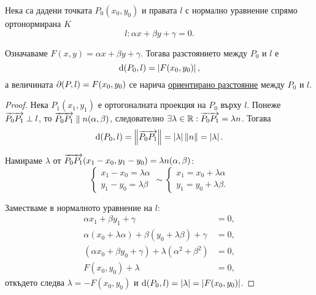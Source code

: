 \documentclass[numbers=endperiod, DIV=15]{scrartcl}
\begin{document}
\begin{theorem}
  Нека са дадени точката $P_0(x_0, y_0)$ и правата $l$ с нормално уравнение спрямо ортонормирана $K$
  \begin{displaymath}
    l: \alpha x + \beta y + \gamma = 0.
  \end{displaymath}

  Означаваме $F(x, y) = \alpha x + \beta y + \gamma$. Тогава разстоянието между $P_0$ и $l$ е
  \begin{displaymath}
    \operatorname{d}(P_0, l) = \left\vert F(x_0, y_0) \right\vert,
  \end{displaymath}
  а величината $\partial(P, l) = F(x_0, y_0)$ се нарича \underline{ориентирано разстояние} между $P_0$ и $l$.
\end{theorem}
\begin{proof}
  Нека $P_1(x_1, y_1)$ е ортогоналната проекция на $P_0$ върху $l$. Понеже $\overrightarrow{P_0 P_1} \perp l$, то $\overrightarrow{P_0 P_1} \parallel n(\alpha, \beta)$, следователно $\exists \lambda \in \mathbb{R}: \overrightarrow{P_0 P_1} = \lambda n$. Тогава
  \begin{displaymath}
    \operatorname{d}(P_0, l)
    =
    \left\Vert \overrightarrow{P_0 P_1} \right\Vert
    =
    \left\vert \lambda \right\vert \left\Vert n \right\Vert
    =
    \left\vert \lambda \right\vert.
  \end{displaymath}

  Намираме $\lambda$ от $\overrightarrow{P_0 P_1}(x_1 - x_0, y_1 - y_0) = \lambda n(\alpha, \beta)$:
  \begin{displaymath}
    \begin{cases}
      x_1 - x_0 = \lambda \alpha \\
      y_1 - y_0 = \lambda \beta
    \end{cases}
    \sim
    \begin{cases}
      x_1 = x_0 + \lambda \alpha \\
      y_1 = y_0 + \lambda \beta.
    \end{cases}
  \end{displaymath}

  Заместваме в нормалното уравнение на $l$:
  \begin{align*}
    \alpha x_1 + \beta y_1 + \gamma &= 0,
    \\
    \alpha (x_0 + \lambda \alpha) + \beta (y_0 + \lambda \beta) + \gamma &= 0,
    \\
    (\alpha x_0 + \beta y_0 + \gamma) + \lambda(\alpha^2 + \beta^2) &= 0,
    \\
    F(x_0, y_0) + \lambda &= 0,
  \end{align*}
  откъдето следва $\lambda = -F(x_0, y_0)$ и $\operatorname{d}(P_0, l) = \left\vert \lambda \right\vert = \left\vert F(x_0, y_0) \right\vert$.
\end{proof}
\end{document}
